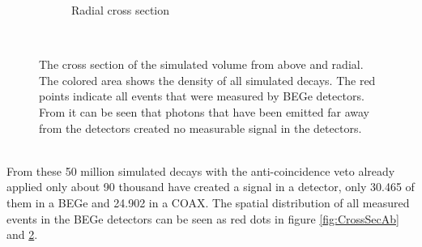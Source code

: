 \documentclass[encoding=utf8,british]{tumphthesis}
\begin{document}
\begin{figure}[t!]
\begin{subfigure}{.5\textwidth}
		\caption{Radial cross section}
		\label{fig:CrossSecRa}
	\end{subfigure}
    \\
	\vspace{0.5cm}
    \caption{
    	The cross section of the simulated volume from above and radial.
    	The colored area shows the density of all simulated decays. 
    	The red points indicate all events that were measured by BEGe detectors.
    	From it can be seen that photons that have been emitted far away from the detectors created no measurable signal in the detectors.
    	}
\vspace{0.5cm}
\end{figure}
\\

From these 50 million simulated decays with the anti-coincidence veto already applied only about 90 thousand have created a signal in a detector, only 30.465 of them in a BEGe and 24.902 in a COAX.
The spatial distribution of all measured events in the BEGe detectors can be seen as red dots in figure \ref{fig:CrossSecAb} and \ref{fig:CrossSecRa}.

\end{document}
